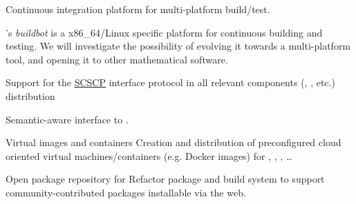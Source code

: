 \begin{workpackage}[id=component-architecture,wphases=0-48!.5,
  title=Component Architecture,lead=UV,
  PSRM=24,UVRM=8,SARM=16, USHRM=4, USORM=6]
\begin{wpdelivs}
\begin{wpdeliv}[due=24,id=portability-cygwin64,dissem=PU,nature=OTHER]
    \end{wpdeliv}

    \begin{wpdeliv}[due=36,id=multiplatform-buildbot,dissem=PP,nature=DEM]
      {Continuous integration platform for multi-platform build/test.}

      \Sage's \emph{buildbot} is a x86\_64/Linux specific platform for
      continuous building and testing. We will investigate the
      possibility of evolving it towards a multi-platform tool, and
      opening it to other mathematical software.
    \end{wpdeliv}%
    \begin{wpdeliv}[due=12,id=scscp-sage,dissem=PU,nature=OTHER]
      {Support for the \href{http://www.symbolic-computing.org/}{SCSCP} interface protocol
        in all relevant components (\Sage, \GAP, etc.) distribution}
    \end{wpdeliv}

    \begin{wpdeliv}[due=36,id=semantic-interface-sage-gap,dissem=PU,nature=OTHER]
      {Semantic-aware \Sage interface to \GAP.}
    \end{wpdeliv}

    \begin{wpdeliv}[due=6,id=virtual-machines,dissem=PU,nature=OTHER]
      {Virtual images and containers} Creation and distribution of
      preconfigured cloud oriented virtual machines/containers
      (e.g. Docker images) for \PariGP, \Sage, \SMC, \dots
    \end{wpdeliv}

    \begin{wpdeliv}[due=24,id=sage-repository,dissem=PU,nature=OTHER]
      {Open package repository for \Sage} Refactor \Sage package and
      build system to support community-contributed packages
      installable via the web.
    \end{wpdeliv}


\end{wpdelivs}
\end{workpackage}

